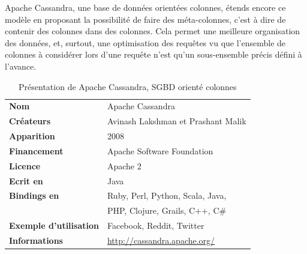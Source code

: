 \documentclass[11pt]{article}
\begin{document}
Apache Cassandra, une base de données orientées colonnes, étends encore ce modèle en proposant la possibilité de faire des méta-colonnes, c'est à dire de contenir des colonnes dans des colonnes. Cela permet une meilleure organisation des données, et, surtout, une optimisation des requêtes vu que l'ensemble de colonnes à considérer lors d'une requête n'est qu'un sous-ensemble précis défini à l'avance.
\begin{table}[H]
  \centering
  \begin{tabular}{l | l}
    \textbf{Nom} & Apache Cassandra \\
    \textbf{Créateurs} & Avinash Lakshman et Prashant Malik \\
    \textbf{Apparition} & 2008 \\
    \textbf{Financement} & Apache Software Foundation \\
    \textbf{Licence} & Apache 2 \\
    \textbf{Ecrit en} & Java \\
    \textbf{Bindings en} & Ruby, Perl, Python, Scala, Java, \\
    &   PHP, Clojure, Grails, C++, C\#\\
    \textbf{Exemple d'utilisation} & Facebook, Reddit, Twitter \\
    \textbf{Informations} & \url{http://cassandra.apache.org/}
  \end{tabular}
  \caption{Présentation de Apache Cassandra, SGBD orienté colonnes}
\end{table} 
\end{document}
